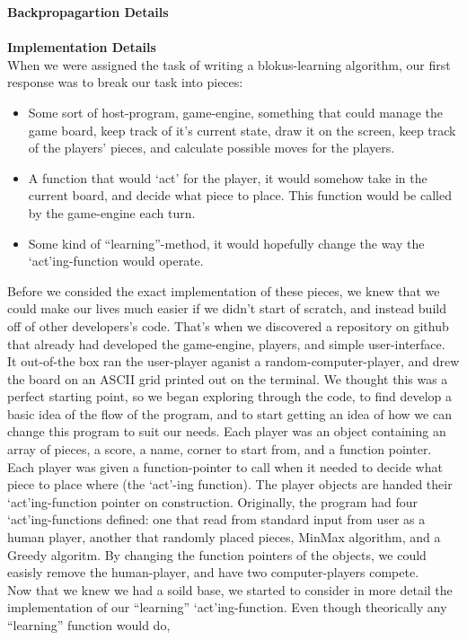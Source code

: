 \documentclass{report}
\begin{document}
	\textbf{Backpropagartion Details}\\
	\blindtext\\
	
	\textbf{Implementation Details}\\
	When we were assigned the task of writing a blokus-learning algorithm, our first response was to break our task into pieces:
	\begin{itemize}
		\item Some sort of host-program, game-engine, something that could manage the game board, keep track of it's current state, draw it on the screen, keep track of the players' pieces,
			and calculate possible moves for the players.
		\item A function that would `act' for the player, it would somehow take in the current board, and decide what piece to place. This function would be called by the game-engine each
			turn.
		\item Some kind of ``learning''-method, it would hopefully change the way the `act'ing-function would operate.
	\end{itemize}
	Before we consided the exact implementation of these pieces, we knew that we could make our lives much easier if we didn't start of scratch, and instead build off of other developers's code.
	That's when we discovered a repository on github that already had developed the game-engine, players, and simple user-interface.\\
	It out-of-the box ran the user-player aganist a random-computer-player, and drew the board on an ASCII grid printed out on the terminal. We thought this was a perfect starting point,
	so we began exploring through the code, to find develop	a basic idea of the flow of the program, and to start getting an idea of how we can change this program to suit our needs.
	Each player was an object containing an array of pieces, a score, a name, corner to start from, and a function pointer. Each player was given a function-pointer to call when it needed
	to decide what piece to place where (the `act'-ing function). The player objects are handed their `act'ing-function pointer on construction. Originally, the program had four `act'ing-functions
	defined: one that read from standard input from user as	a human player, another that randomly placed pieces, MinMax algorithm, and a Greedy algoritm. By changing the function pointers of
	the objects, we could easisly remove the human-player, and have two computer-players compete.\\
	Now that we knew we had a soild base, we started to consider in more detail the implementation of our ``learning'' `act'ing-function. Even though theorically any ``learning'' function would do,
\end{document}
